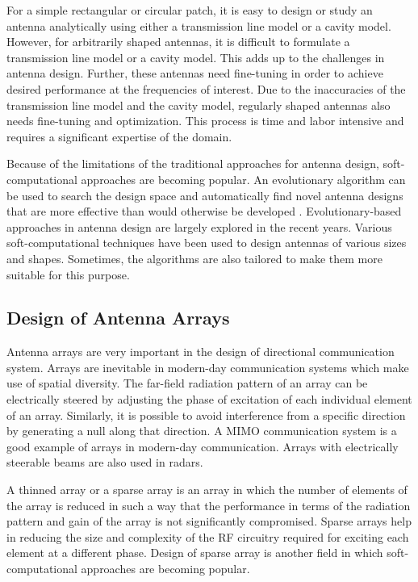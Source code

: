 For a simple rectangular or circular patch, it is easy to design or study an antenna analytically using either a transmission line model or a cavity model. However, for arbitrarily shaped antennas, it is difficult to formulate a transmission line model or a cavity model. This adds up to the challenges in antenna design. Further, these antennas need fine-tuning in order to achieve desired performance at the frequencies of interest. Due to the inaccuracies of the transmission line model and the cavity model, regularly shaped antennas also needs fine-tuning and optimization. This process is time and labor intensive and requires a significant expertise of the domain.

Because of the limitations of the traditional approaches for antenna design, soft-computational approaches are becoming popular. An evolutionary algorithm can be used to search the design space and automatically find novel antenna designs that are more effective than would otherwise be developed \cite{cadNASA}. Evolutionary-based approaches in antenna design are largely explored in the recent years. Various soft-computational techniques have been used to design antennas of various sizes and shapes. Sometimes, the algorithms are also tailored to make them more suitable for this purpose.

\subsection{Design of Antenna Arrays}
Antenna arrays are very important in the design of directional communication system. Arrays are inevitable in modern-day communication systems which make use of spatial diversity. The far-field radiation pattern of an array can be electrically steered by adjusting the phase of excitation of each individual element of an array. Similarly, it is possible to avoid interference from a specific direction by generating a null along that direction. A MIMO communication system is a good example of arrays in modern-day communication. Arrays with electrically steerable beams are also used in radars.

A thinned array or a sparse array is an array in which the number of elements of the array is reduced in such a way that the performance in terms of the radiation pattern and gain of the array is not significantly compromised. Sparse arrays help in reducing the size and complexity of the RF circuitry required for exciting each element at a different phase. Design of sparse array is another field in which soft-computational approaches are becoming popular.


